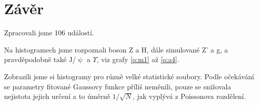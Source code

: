 \section*{Závěr}
Zpracovali jsme 106 událostí.

Na histogramech jsme rozpoznali boson Z a H, dále simulované Z' a g, a pravděpodobně také J/$\uppsi$ a $\Upsilon$, viz grafy \ref{o:m1} až \ref{o:a4}.

Zobrazili jsme si histogramy pro různě velké statistické soubory. Podle očekávání se parametry fitované Gaussovy funkce příliš neměnili, pouze se snižovala nejistota jejich určení a to úměrně $1/\sqrt{N}$, jak vyplývá z Poissonova rozdělení.